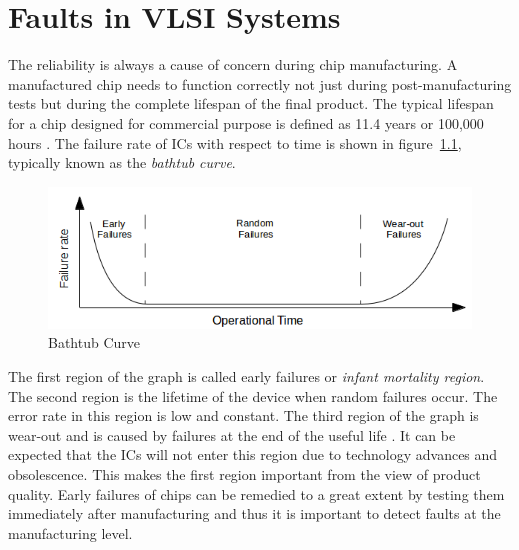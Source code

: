 \chapter{Faults in VLSI Systems}
\label{chap:chapter2}

The reliability is always a cause of concern during chip manufacturing. A manufactured chip needs to function correctly not just during post-manufacturing tests but during the complete lifespan of the final product. The typical lifespan for a chip designed for commercial purpose is defined as 11.4 years or 100,000 hours \cite{kishore2009}. The failure rate of ICs with respect to time is shown in figure~\ref{fig:bathtubcurve}, typically known as the \emph{bathtub curve}.

\begin{figure}[h]
  \begin{center}
    \captionsetup{justification=centering}
    \includegraphics[scale=0.5]{figures/bathtubcurve.png}
    \caption{Bathtub Curve}
    \label{fig:bathtubcurve}
  \end{center}
\end{figure}

The first region of the graph is called early failures or \emph{infant mortality region}. The second region is the lifetime of the device when random failures occur. The error rate in this region is low and constant. The third region of the graph is wear-out and is caused by failures at the end of the useful life \cite{kishore2009}. It can be expected that the ICs will not enter this region due to technology advances and obsolescence. This makes the first region important from the view of product quality. Early failures of chips can be remedied to a great extent by testing them immediately after manufacturing \cite{Agrawal2000} and thus it is important to detect faults at the manufacturing level.

